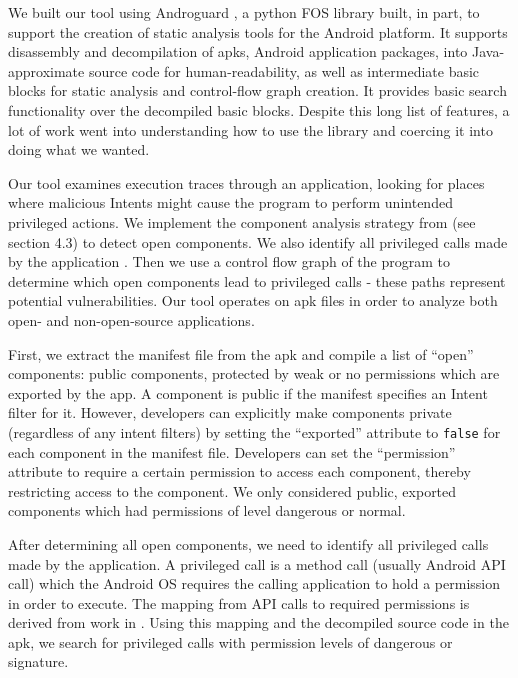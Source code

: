\documentclass[12pt,a4paper]{article}
\begin{document}
We built our tool using Androguard \cite{androguard}, a python FOS library
built, in part, to support the creation of static analysis tools for the Android
platform. It supports disassembly and decompilation of apks, Android application
packages, into Java-approximate source code for human-readability, as well as
intermediate basic blocks for static analysis and control-flow graph
creation. It provides basic search functionality over the decompiled basic
blocks. Despite this long list of features, a lot of work went into
understanding how to use the library and coercing it into doing what we wanted.

Our tool examines execution traces through an application, looking for places
where malicious Intents might cause the program to perform unintended privileged
actions. We implement the component analysis strategy from
\cite{chin_analyzing_2011} (see section 4.3) to detect open components. We also
identify all privileged calls made by the application
\cite{felt_android_2011}. Then we use a control flow graph of the program to
determine which open components lead to privileged calls - these paths represent
potential vulnerabilities. Our tool operates on apk files in order to analyze
both open- and non-open-source applications.

First, we extract the manifest file from the apk and compile a list of ``open''
components: public components, protected by weak or no permissions which are
exported by the app. A component is public if the manifest specifies an Intent
filter for it. However, developers can explicitly make components private
(regardless of any intent filters) by setting the ``exported'' attribute to
\texttt{false} for each component in the manifest file. Developers can set the
``permission'' attribute to require a certain permission to access each
component, thereby restricting access to the component. We only considered
public, exported components which had permissions of level dangerous or normal.

After determining all open components, we need to identify all privileged calls
made by the application. A privileged call is a method call (usually Android API
call) which the Android OS requires the calling application to hold a permission
in order to execute. The mapping from API calls to required permissions is
derived from work in \cite{felt_android_2011}. Using this mapping and the
decompiled source code in the apk, we search for privileged calls with
permission levels of dangerous or signature.
\end{document}
